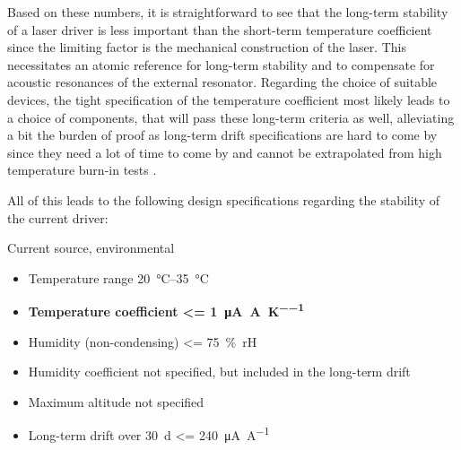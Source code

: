 Based on these numbers, it is straightforward to see that the long-term stability of a laser driver is less important than the short-term temperature coefficient since the limiting factor is the mechanical construction of the laser. This necessitates an atomic reference for long-term stability and to compensate for acoustic resonances of the external resonator. Regarding the choice of suitable devices, the tight specification of the temperature coefficient most likely leads to a choice of components, that will pass these long-term criteria as well, alleviating a bit the burden of proof as long-term drift specifications are hard to come by since they need a lot of time to come by and cannot be extrapolated from high temperature burn-in tests \cite{voltage_reference_drift}.


All of this leads to the following design specifications regarding the stability of the current driver:

\begin{center}
    \begin{specifications}[label={lst:dgDrive_specs_environment}]{Current source, environmental}
    \begin{itemize}
        \item Temperature range \qtyrange[text-series-to-math, reset-text-series = false, reset-math-version = false, range-phrase=\textup{ to }]{20}{35}{\celsius}
        \item \textbf{Temperature coefficient \qty[text-series-to-math, reset-text-series = false, reset-math-version = false]{<= 1}{\uA \per \A \per \K}}
        \item Humidity (non-condensing) \qty{<= 75}{\percent rH}
        \item Humidity coefficient not specified, but included in the long-term drift
        \item Maximum altitude not specified
        \item Long-term drift over \qty{30}{\day} \qty{<= 240}{\uA \per \A}
    \end{itemize}
    \end{specifications}
\end{center}

